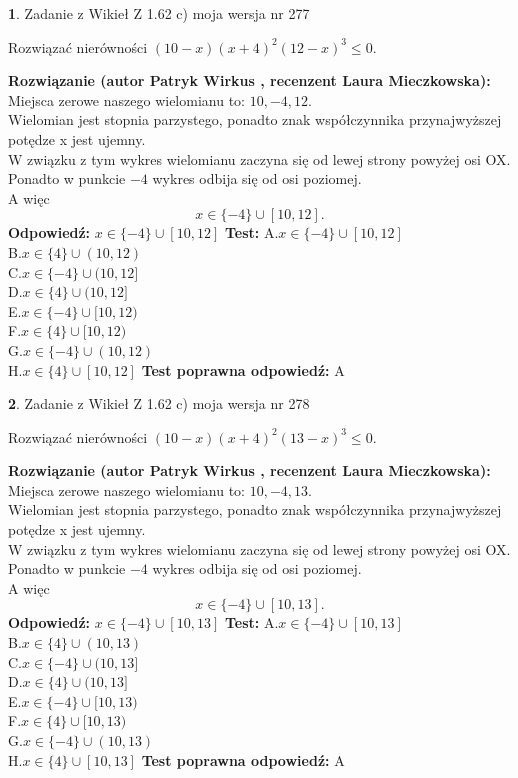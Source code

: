 \documentclass[12pt, a4paper]{article}
\theoremstyle{definition} %
\newtheorem{zad}{}
\newcommand{\zadStart}[1]{\begin{zad}#1\newline}
\newcommand{\zadStop}{\end{zad}}
\newcommand{\rozwStart}[2]{\noindent \textbf{Rozwiązanie (autor #1 , recenzent #2): }\newline}
\newcommand{\rozwStop}{\newline}
\newcommand{\odpStart}{\noindent \textbf{Odpowiedź:}\newline}
\newcommand{\odpStop}{\newline}
\newcommand{\testStart}{\noindent \textbf{Test:}\newline}
\newcommand{\testStop}{\newline}
\newcommand{\kluczStart}{\noindent \textbf{Test poprawna odpowiedź:}\newline}
\newcommand{\kluczStop}{\newline}
\begin{document}
\zadStart{Zadanie z Wikieł Z 1.62 c) moja wersja nr 277}

Rozwiązać nierówności $(10-x)(x+4)^{2}(12-x)^{3}\le0$.
\zadStop
\rozwStart{Patryk Wirkus}{Laura Mieczkowska}
Miejsca zerowe naszego wielomianu to: $10, -4, 12$.\\
Wielomian jest stopnia parzystego, ponadto znak współczynnika przy\linebreak najwyższej potędze x jest ujemny.\\ W związku z tym wykres wielomianu zaczyna się od lewej strony powyżej osi OX.\\
Ponadto w punkcie $-4$ wykres odbija się od osi poziomej.\\
A więc $$x \in \{-4\} \cup [10,12].$$
\rozwStop
\odpStart
$x \in \{-4\} \cup [10,12]$
\odpStop
\testStart
A.$x \in \{-4\} \cup [10,12]$\\
B.$x \in \{4\} \cup (10,12)$\\
C.$x \in \{-4\} \cup (10,12]$\\
D.$x \in \{4\} \cup (10,12]$\\
E.$x \in \{-4\} \cup [10,12)$\\
F.$x \in \{4\} \cup [10,12)$\\
G.$x \in \{-4\} \cup (10,12)$\\
H.$x \in \{4\} \cup [10,12]$
\testStop
\kluczStart
A
\kluczStop



\zadStart{Zadanie z Wikieł Z 1.62 c) moja wersja nr 278}

Rozwiązać nierówności $(10-x)(x+4)^{2}(13-x)^{3}\le0$.
\zadStop
\rozwStart{Patryk Wirkus}{Laura Mieczkowska}
Miejsca zerowe naszego wielomianu to: $10, -4, 13$.\\
Wielomian jest stopnia parzystego, ponadto znak współczynnika przy\linebreak najwyższej potędze x jest ujemny.\\ W związku z tym wykres wielomianu zaczyna się od lewej strony powyżej osi OX.\\
Ponadto w punkcie $-4$ wykres odbija się od osi poziomej.\\
A więc $$x \in \{-4\} \cup [10,13].$$
\rozwStop
\odpStart
$x \in \{-4\} \cup [10,13]$
\odpStop
\testStart
A.$x \in \{-4\} \cup [10,13]$\\
B.$x \in \{4\} \cup (10,13)$\\
C.$x \in \{-4\} \cup (10,13]$\\
D.$x \in \{4\} \cup (10,13]$\\
E.$x \in \{-4\} \cup [10,13)$\\
F.$x \in \{4\} \cup [10,13)$\\
G.$x \in \{-4\} \cup (10,13)$\\
H.$x \in \{4\} \cup [10,13]$
\testStop
\kluczStart
A
\kluczStop
\end{document}
